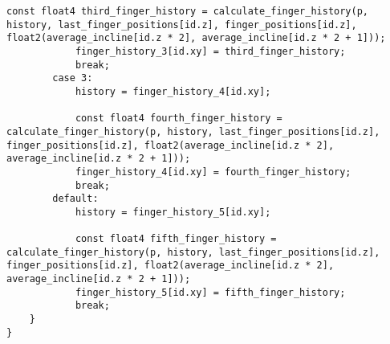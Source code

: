 \begin{lstlisting}[language=HLSL]
            const float4 third_finger_history = calculate_finger_history(p, history, last_finger_positions[id.z], finger_positions[id.z], float2(average_incline[id.z * 2], average_incline[id.z * 2 + 1]));
            finger_history_3[id.xy] = third_finger_history;
            break;
        case 3:
            history = finger_history_4[id.xy];

            const float4 fourth_finger_history = calculate_finger_history(p, history, last_finger_positions[id.z], finger_positions[id.z], float2(average_incline[id.z * 2], average_incline[id.z * 2 + 1]));
            finger_history_4[id.xy] = fourth_finger_history;
            break;
        default:
            history = finger_history_5[id.xy];

            const float4 fifth_finger_history = calculate_finger_history(p, history, last_finger_positions[id.z], finger_positions[id.z], float2(average_incline[id.z * 2], average_incline[id.z * 2 + 1]));
            finger_history_5[id.xy] = fifth_finger_history;
            break;
    }
}
\end{lstlisting}